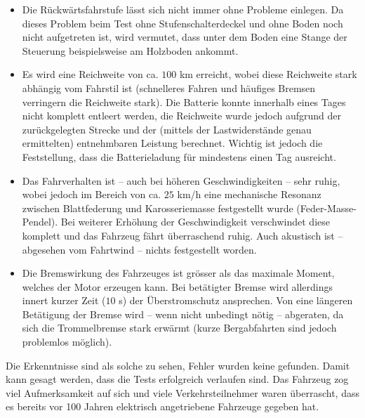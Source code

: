 \begin{itemize}
	\item Die Rückwärtsfahrstufe lässt sich nicht immer ohne Probleme einlegen. Da dieses Problem beim Test ohne Stufenschalterdeckel und ohne Boden noch nicht aufgetreten ist, wird vermutet, dass unter dem Boden eine Stange der Steuerung beispielsweise am Holzboden ankommt.
	\item Es wird eine Reichweite von ca. $100$ km erreicht, wobei diese Reichweite stark abhängig vom Fahrstil ist (schnelleres Fahren und häufiges Bremsen verringern die Reichweite stark). Die Batterie konnte innerhalb eines Tages nicht komplett entleert werden, die Reichweite wurde jedoch aufgrund der zurückgelegten Strecke und der (mittels der Lastwiderstände genau ermittelten) entnehmbaren Leistung berechnet. Wichtig ist jedoch die Feststellung, dass die Batterieladung für mindestens einen Tag ausreicht.
	\item Das Fahrverhalten ist -- auch bei höheren Geschwindigkeiten -- sehr ruhig, wobei jedoch im Bereich von ca. $25$ km/h eine mechanische Resonanz zwischen Blattfederung und Karosseriemasse festgestellt wurde (Feder-Masse-Pendel). Bei weiterer Erhöhung der Geschwindigkeit verschwindet diese komplett und das Fahrzeug fährt überraschend ruhig. Auch akustisch ist -- abgesehen vom Fahrtwind -- nichts festgestellt worden.
	\item Die Bremswirkung des Fahrzeuges ist grösser als das maximale Moment, welches der Motor erzeugen kann. Bei betätigter Bremse wird allerdings innert kurzer Zeit ($10$ s) der Überstromschutz ansprechen. Von eine längeren Betätigung der Bremse wird -- wenn nicht unbedingt nötig -- abgeraten, da sich die Trommelbremse stark erwärmt (kurze Bergabfahrten sind jedoch problemlos möglich).
\end{itemize}

Die Erkenntnisse sind als solche zu sehen, Fehler wurden keine gefunden. Damit kann gesagt werden, dass die Tests erfolgreich verlaufen sind. Das Fahrzeug zog viel Aufmerksamkeit auf sich und viele Verkehrsteilnehmer waren überrascht, dass es bereits vor 100 Jahren elektrisch angetriebene Fahrzeuge gegeben hat.

\newpage
\color{black}